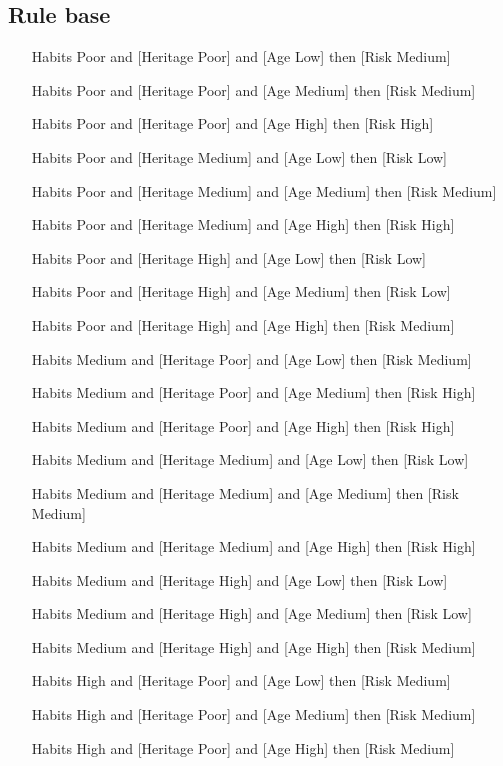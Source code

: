 \documentclass[conference]{IEEEtran}
\begin{document}
\subsection{Rule base}
\begin{enumerate}
\item [Habits Poor] and [Heritage Poor] and [Age Low] then [Risk Medium]
\item [Habits Poor] and [Heritage Poor] and [Age Medium] then [Risk Medium]
\item [Habits Poor] and [Heritage Poor] and [Age High] then [Risk High]
\item [Habits Poor] and [Heritage Medium] and [Age Low] then [Risk Low]
\item [Habits Poor] and [Heritage Medium] and [Age Medium] then [Risk Medium]
\item [Habits Poor] and [Heritage Medium] and [Age High] then [Risk High]
\item [Habits Poor] and [Heritage High] and [Age Low] then [Risk Low]
\item [Habits Poor] and [Heritage High] and [Age Medium] then [Risk Low]
\item [Habits Poor] and [Heritage High] and [Age High] then [Risk Medium]
\item [Habits Medium] and [Heritage Poor] and [Age Low] then [Risk Medium]
\item [Habits Medium] and [Heritage Poor] and [Age Medium] then [Risk High]
\item [Habits Medium] and [Heritage Poor] and [Age High] then [Risk High]
\item [Habits Medium] and [Heritage Medium] and [Age Low] then [Risk Low]
\item [Habits Medium] and [Heritage Medium] and [Age Medium] then [Risk Medium]
\item [Habits Medium] and [Heritage Medium] and [Age High] then [Risk High]
\item [Habits Medium] and [Heritage High] and [Age Low] then [Risk Low]
\item [Habits Medium] and [Heritage High] and [Age Medium] then [Risk Low]
\item [Habits Medium] and [Heritage High] and [Age High] then [Risk Medium]
\item [Habits High] and [Heritage Poor] and [Age Low] then [Risk Medium]
\item [Habits High] and [Heritage Poor] and [Age Medium] then [Risk Medium]
\item [Habits High] and [Heritage Poor] and [Age High] then [Risk Medium]

\end{enumerate}
\end{document}
